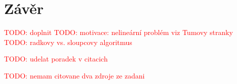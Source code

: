 \documentclass[11pt,american,czech,oneside]{book}
\theoremstyle{plain}
\theoremstyle{definition}
\newcommand{\TODO}[1]{\textcolor{red}{TODO: #1}}
\begin{document}

\chapter*{Závěr}
\TODO{doplnit}
\TODO{motivace: nelineární problém viz Tumovy stranky}
\TODO{radkovy vs. sloupcovy algoritmus}


\newpage



\TODO{udelat poradek v citacich}

\TODO{nemam citovane dva zdroje ze zadani}
\end{document}
